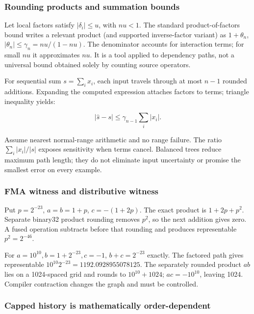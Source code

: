 \subsubsection{Rounding products and summation bounds}\label{rounding-products-and-summation-bounds}

Let local factors satisfy \(|\delta_i|\le u\), with \(nu<1\). The standard product-of-factors bound writes a relevant product (and supported inverse-factor variant) as \(1+\theta_n\), \(|\theta_n|\le\gamma_n=nu/(1-nu)\). The denominator accounts for interaction terms; for small \(nu\) it approximates \(nu\). It is a tool applied to dependency paths, not a universal bound obtained solely by counting source operators.

For sequential sum \(s=\sum_i x_i\), each input travels through at most \(n-1\) rounded additions. Expanding the computed expression attaches factors to terms; triangle inequality yields:

\[
|\widehat s-s|\le\gamma_{n-1}\sum_i|x_i|.
\]

Assume nearest normal-range arithmetic and no range failure. The ratio \(\sum_i|x_i|/|s|\) exposes sensitivity when terms cancel. Balanced trees reduce maximum path length; they do not eliminate input uncertainty or promise the smallest error on every example.

\subsubsection{FMA witness and distributive witness}\label{fma-witness-and-distributive-witness}

Put \(p=2^{-23}\), \(a=b=1+p\), \(c=-(1+2p)\). The exact product is \(1+2p+p^2\). Separate binary32 product rounding removes \(p^2\), so the next addition gives zero. A fused operation subtracts before that rounding and produces representable \(p^2=2^{-46}\).

For \(a=10^{10},b=1+2^{-23},c=-1\), \(b+c=2^{-23}\) exactly. The factored path gives representable \(10^{10}2^{-23}=1192.0928955078125\). The separately rounded product \(ab\) lies on a 1024-spaced grid and rounds to \(10^{10}+1024\); \(ac=-10^{10}\), leaving 1024. Compiler contraction changes the graph and must be controlled.

\subsubsection{Capped history is mathematically order-dependent}\label{capped-history-is-mathematically-order-dependent}

